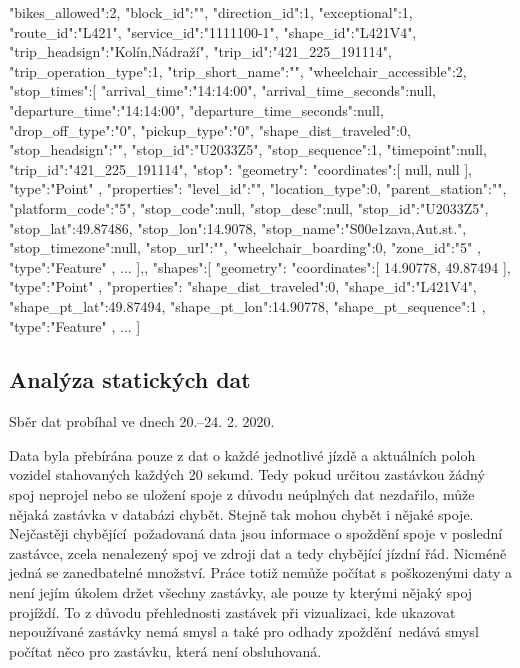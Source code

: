 \begin{code}[frame=none]
"bikes_allowed":2,
"block_id":"",
"direction_id":1,
"exceptional":1,
"route_id":"L421",
"service_id":"1111100-1",
"shape_id":"L421V4",
"trip_headsign":"Kolín,Nádraží",
"trip_id":"421_225_191114",
"trip_operation_type":1,
"trip_short_name":"",
"wheelchair_accessible":2,
"stop_times":[{
  "arrival_time":"14:14:00",
  "arrival_time_seconds":null,
  "departure_time":"14:14:00",
  "departure_time_seconds":null,
  "drop_off_type":"0",
  "pickup_type":"0",
  "shape_dist_traveled":0,
  "stop_headsign":"",
  "stop_id":"U2033Z5",
  "stop_sequence":1,
  "timepoint":null,
  "trip_id":"421_225_191114",
  "stop":{
    "geometry":{
      "coordinates":[
        null,
        null
      ],
      "type":"Point"
    },
    "properties":{
      "level_id":"",
      "location_type":0,
      "parent_station":"",
      "platform_code":"5",
      "stop_code":null,
      "stop_desc":null,
      "stop_id":"U2033Z5",
      "stop_lat":49.87486,
      "stop_lon":14.9078,
      "stop_name":"S\u00e1zava,Aut.st.",
      "stop_timezone":null,
      "stop_url":"",
      "wheelchair_boarding":0,
      "zone_id":"5"
    },
    "type":"Feature"
  },
  ...
],},
"shapes":[{
  "geometry":{
    "coordinates":[
      14.90778,
      49.87494
    ],
    "type":"Point"
  },
  "properties":{
    "shape_dist_traveled":0,
    "shape_id":"L421V4",
    "shape_pt_lat":49.87494,
    "shape_pt_lon":14.90778,
    "shape_pt_sequence":1
  },
  "type":"Feature"
},
...
]

\end{code}

\subsection{Analýza statických dat}

Sběr dat probíhal ve dnech 20.--24. 2. 2020.

\bigbreak

Data byla přebírána pouze z dat o každé jednotlivé jízdě a aktuálních poloh vozidel stahovaných každých 20 sekund. Tedy pokud určitou zastávkou žádný spoj neprojel nebo se uložení spoje z důvodu neúplných dat nezdařilo, může nějaká zastávka v databázi chybět. Stejně tak mohou chybět i nějaké spoje. Nejčastěji chybějící požadovaná data jsou informace o spoždění spoje v poslední zastávce, zcela nenalezený spoj ve zdroji dat a tedy chybějící jízdní řád. Nicméně jedná se zanedbatelné množství. Práce totiž nemůže počítat s poškozenými daty a není jejím úkolem držet všechny zastávky, ale pouze ty kterými nějaký spoj projíždí. To z důvodu přehlednosti zastávek při vizualizaci, kde ukazovat nepoužívané zastávky nemá smysl a také pro odhady zpoždění nedává smysl počítat něco pro zastávku, která není obsluhovaná.

